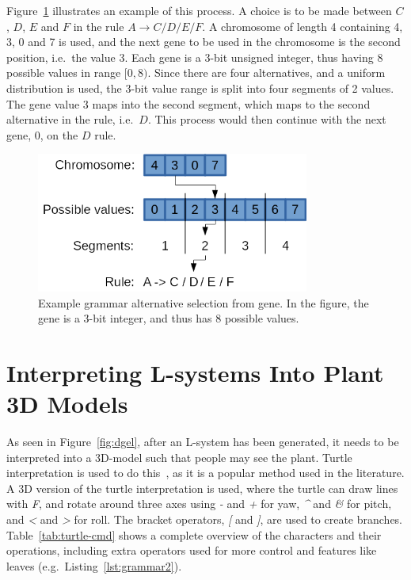 Figure~\ref{fig:gene} illustrates an example of this process.
A choice is to be made between $C$, $D$, $E$ and $F$ in the rule $A \rightarrow C / D / E / F$.
A chromosome of length 4 containing 4, 3, 0 and 7 is used, and the next gene to be used in the chromosome is the second position, i.e.\ the value 3.
Each gene is a 3-bit unsigned integer, thus having 8 possible values in range $[0, 8)$.
Since there are four alternatives, and a uniform distribution is used, the 3-bit value range is split into four segments of 2 values.
The gene value 3 maps into the second segment, which maps to the second alternative in the rule, i.e.\ $D$.
This process would then continue with the next gene, 0, on the $D$ rule.

\begin{figure}
    \centering
    \includegraphics[width=0.8\textwidth]{figures/gene}
    \caption[Example grammar alternative selection from gene]{Example grammar alternative selection from gene. In the figure, the gene is a 3-bit integer, and thus has 8 possible values.}
    \label{fig:gene}
\end{figure}

\section{Interpreting L-systems Into Plant 3D Models}
As seen in Figure~\ref{fig:dgel}, after an L-system has been generated, it needs to be interpreted into a 3D-model such that people may see the plant.
Turtle interpretation is used to do this~\cite{2012Prusinkiewicz}, as it is a popular method used in the literature.
A 3D version of the turtle interpretation is used, where the turtle can draw lines with \textit{F}, and rotate around three axes using \textit{-} and \textit{+} for yaw, \textit{\textasciicircum} and \textit{\&} for pitch, and \textit{<} and \textit{>} for roll.
The bracket operators, \textit{[} and \textit{]}, are used to create branches.
Table~\ref{tab:turtle-cmd} shows a complete overview of the characters and their operations, including extra operators used for more control and features like leaves (e.g.\ Listing~\ref{lst:grammar2}).

